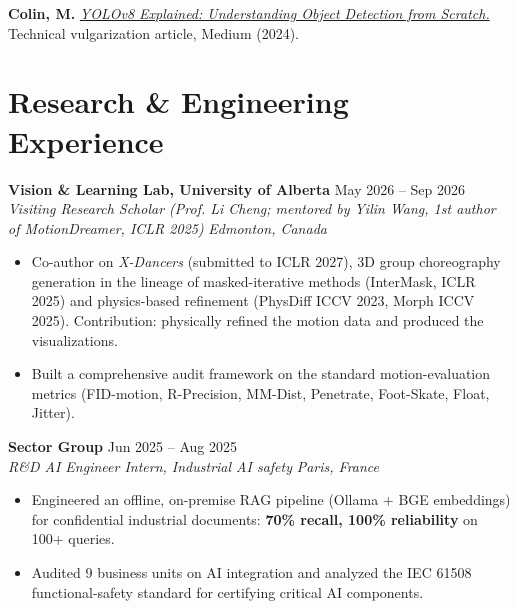 \documentclass[10pt, letterpaper]{article}
\newcommand{\entry}[4]{
  \noindent \textbf{#1} \hfill #2 \\
  \textit{#3} \hfill \textit{#4} \par
}
\begin{document}
\vspace{1pt}

\textbf{Colin, M.} \textit{\href{https://medium.com/@melissa.colin/yolov8-explained-understanding-object-detection-from-scratch-763479652312}{YOLOv8 Explained: Understanding Object Detection from Scratch.}} Technical vulgarization article, Medium (2024).

\section{Research \& Engineering Experience}

\entry{Vision \& Learning Lab, University of Alberta}{May 2026 -- Sep 2026}{Visiting Research Scholar (Prof. Li Cheng; mentored by Yilin Wang, 1st author of MotionDreamer, ICLR 2025)}{Edmonton, Canada}
\begin{itemize}
    \item Co-author on \textit{X-Dancers} (submitted to ICLR 2027), 3D group choreography generation in the lineage of masked-iterative methods (InterMask, ICLR 2025) and physics-based refinement (PhysDiff ICCV 2023, Morph ICCV 2025). Contribution: physically refined the motion data and produced the visualizations.
    \item Built a comprehensive audit framework on the standard motion-evaluation metrics (FID-motion, R-Precision, MM-Dist, Penetrate, Foot-Skate, Float, Jitter).
\end{itemize}

\vspace{3pt}

\entry{Sector Group}{Jun 2025 -- Aug 2025}{R\&D AI Engineer Intern, Industrial AI safety}{Paris, France}
\begin{itemize}
    \item Engineered an offline, on-premise RAG pipeline (Ollama + BGE embeddings) for confidential industrial documents: \textbf{70\% recall, 100\% reliability} on 100+ queries.
    \item Audited 9 business units on AI integration and analyzed the IEC 61508 functional-safety standard for certifying critical AI components.
\end{itemize}

\vspace{3pt}
\end{document}

